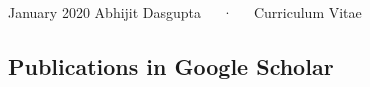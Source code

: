 \documentclass[11pt, a4paper]{awesome-cv}
\begin{document}
\makecvheader

\makecvfooter
  {January 2020}
    {Abhijit Dasgupta~~~·~~~Curriculum Vitae}
  {\thepage}





\hypertarget{publications-in-google-scholar}{%
\subsection{Publications in Google Scholar}\label{publications-in-google-scholar}}
\end{document}
